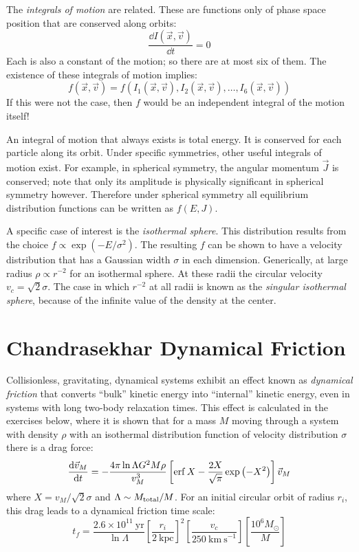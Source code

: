 The {\it integrals of motion} are related. These are functions only of
phase space position that are conserved along orbits:
\begin{equation}
\frac{\dd{I(\vec{x}, \vec{v})}}{\dd{t}} = 0 
\end{equation}
Each is also a constant of the motion; so there are at most six of
them. The existence of these integrals of motion implies:
\begin{equation}
f(\vec{x}, \vec{v}) = f\left(I_1(\vec{x}, \vec{v}),
I_2(\vec{x}, \vec{v}), \ldots, I_6(\vec{x}, \vec{v})\right)
\end{equation}
If this were not the case, then $f$ would be an independent integral
of the motion itself!

An integral of motion that always exists is total energy. It is
conserved for each particle along its orbit. Under specific
symmetries, other useful integrals of motion exist. For example, in
spherical symmetry, the angular momentum $\vec{J}$ is conserved; note
that only its amplitude is physically significant in spherical
symmetry however. Therefore under spherical symmetry all equilibrium
distribution functions can be written as $f(E, J)$. 

A specific case of interest is the {\it isothermal sphere}. This
distribution results from the choice $f\propto \exp(-E/\sigma^2)$. The
resulting $f$ can be shown to have a velocity distribution that has a
Gaussian width $\sigma$ in each dimension. Generically, at large
radius $\rho \propto r^{-2}$ for an isothermal sphere. At these radii
the circular velocity $v_c = \sqrt{2}\sigma$. The case in which
$r^{-2}$ at all radii is known as the {\it singular isothermal
sphere}, because of the infinite value of the density at the center.

\section{Chandrasekhar Dynamical Friction}

Collisionless, gravitating, dynamical systems exhibit an effect known
as {\it dynamical friction} that converts ``bulk'' kinetic energy into
``internal'' kinetic energy, even in systems with long two-body
relaxation times. This effect is calculated in the exercises below,
where it is shown that for a mass $M$ moving through a system with
density $\rho$ with an isothermal distribution function of velocity
distribution $\sigma$ there is a drag force:
\begin{equation}
\frac{{\rm d}\vec{v}_M}{{\rm d}t} = - \frac{4\pi \ln\Lambda
G^2M\rho}{v_M^3} \left[\operatorname{erf} X
-  \frac{2X}{\sqrt{\pi}} \exp\left(-X^2\right) \right] \vec{v}_M
\end{equation}
where $X = v_M /\sqrt{2} \sigma$ and $\Lambda \sim M_{\rm total} / M$.
For an initial circular orbit of radius $r_i$, this drag leads to a
dynamical friction time scale:
\begin{equation}
t_{f} = \frac{2.6 \times
10^{11} \mathrm{~yr}}{\ln \Lambda} \left[\frac{r_i}{2\mathrm{~kpc}}\right]^2
\left[\frac{v_c}{250\mathrm{~km~s}^{-1}} \right]
\left[\frac{10^6 M_\odot}{M}\right]
\end{equation}

